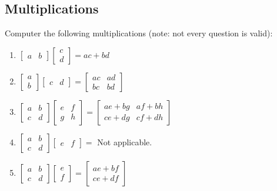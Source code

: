 \documentclass{assignment}
\begin{document}
\begin{problem}
\subsection{Multiplications}
\noindent Computer the following multiplications (note: not every question is valid):
\begin{enumerate}
    \item $\begin{bmatrix}a & b\end{bmatrix} \begin{bmatrix}c \\ d\end{bmatrix} = ac+bd$
    \item $\begin{bmatrix}a \\ b\end{bmatrix} \begin{bmatrix}c & d\end{bmatrix} = \begin{bmatrix}ac & ad \\ bc & bd\end{bmatrix}$
    \item $\begin{bmatrix}a & b \\ c & d\end{bmatrix} \begin{bmatrix}e & f \\ g & h\end{bmatrix} = \begin{bmatrix}ae+bg & af+bh \\ ce+dg & cf+dh\end{bmatrix}$
    \item $\begin{bmatrix}a & b \\ c & d\end{bmatrix} \begin{bmatrix}e & f\end{bmatrix} =$ Not applicable.
    \item $\begin{bmatrix}a & b \\ c & d\end{bmatrix} \begin{bmatrix}e \\ f\end{bmatrix} = \begin{bmatrix}ae + bf \\ ce + df\end{bmatrix}$
    

\end{enumerate}
\end{problem}
\end{document}
